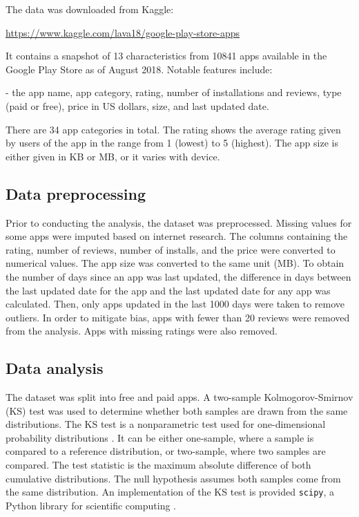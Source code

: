 \documentclass{article}
\begin{document}
The data was downloaded from Kaggle:
\begin{center}
    \url{https://www.kaggle.com/lava18/google-play-store-apps}
\end{center} It contains a snapshot of 13 characteristics from 10841 apps available in the Google Play Store as of August 2018. Notable features include:

- the app name, app category, rating, number of installations and reviews, type (paid or free), price in US dollars, size, and last updated date.

There are 34 app categories in total. The rating shows the average rating given by users of the app in the range from 1 (lowest) to 5 (highest). The app size is either given in KB or MB, or it varies with device.

\subsection{Data preprocessing}

Prior to conducting the analysis, the dataset was preprocessed. Missing values for some apps were imputed based on internet research. The columns containing the rating, number of reviews, number of installs, and the price were converted to numerical values. The app size was converted to the same unit (MB). To obtain the number of days since an app was last updated, the difference in days between the last updated date for the app and the last updated date for any app was calculated. Then, only apps updated in the last 1000 days were taken to remove outliers. In order to mitigate bias, apps with fewer than 20 reviews were removed from the analysis. Apps with missing ratings were also removed.

\subsection{Data analysis}

The dataset was split into free and paid apps. A two-sample Kolmogorov-Smirnov (KS) test was used to determine whether both samples are drawn from the same distributions. The KS test is a nonparametric test used for one-dimensional probability distributions \cite{kstest}. It can be either one-sample, where a sample is compared to a reference distribution, or two-sample, where two samples are compared. The test statistic is the maximum absolute difference of both cumulative distributions. The null hypothesis assumes both samples come from the same distribution. An implementation of the KS test is provided \verb+scipy+, a Python library for scientific computing \cite{scipy}.
\end{document}
